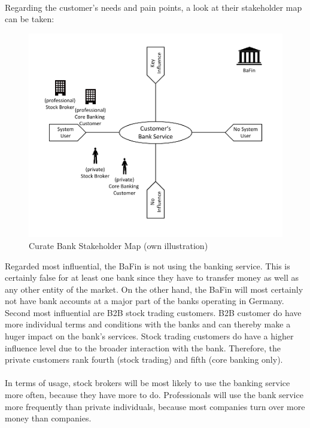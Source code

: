 \paragraph{} Regarding the customer's needs and pain points, a look at their stakeholder map can be taken:

\begin{figure}[H]
    \centering
    \includegraphics[height=.5\textheight]{img/smBank.pdf}
    \caption[Curate Bank Stakeholder Map]{Curate Bank Stakeholder Map (own illustration)}
    \label{fig:my_label}
\end{figure}

Regarded most influential, the BaFin is not using the banking service. This is certainly false for at least one bank since they have to transfer money as well as any other entity of the market. On the other hand, the BaFin will most certainly not have bank accounts at a major part of the banks operating in Germany. Second most influential are B2B stock trading customers. B2B customer do have more individual terms and conditions with the banks and can thereby make a huger impact on the bank's services. Stock trading customers do have a higher influence level due to the broader interaction with the bank. Therefore, the private customers rank fourth (stock trading) and fifth (core banking only).

\paragraph{} In terms of usage, stock brokers will be most likely to use the banking service more often, because they have more to do. Professionals will use the bank service more frequently than private individuals, because most companies turn over more money than companies. 

